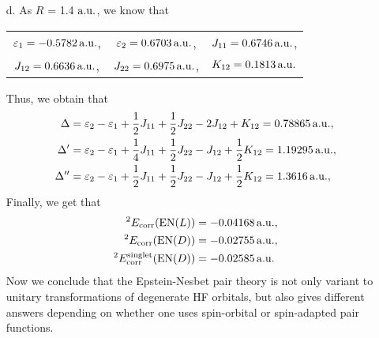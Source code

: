 \documentclass[a4paper]{book}
\newcounter{solution}[chapter]
\newcommand{\corr}{{\rm corr}}
\newcommand{\au}{{\rm a.u.}}
\begin{document}
\begin{solution}
\begin{itemize}
	\item[d.] As $R$ = 1.4 $\au$, we know that
	\begin{center}
	\begin{tabular}{ccc}
		$\varepsilon_1 = -0.5782\,\au$, & $\varepsilon_2 = 0.6703\, \au$, & $J_{11} = 0.6746\,\au$, \\
		$J_{12} = 0.6636\,\au$, & $J_{22} = 0.6975\,\au$, & $K_{12} = 0.1813\,\au$
	\end{tabular}
	\end{center}
	Thus, we obtain that
	\begin{align*}
		\Delta &= \varepsilon_2 - \varepsilon_1 + \frac{1}{2} J_{11} + \frac{1}{2} J_{22} - 2 J_{12} + K_{12} = 0.78865 \, \au , \\
		\Delta^\prime &= \varepsilon_2 - \varepsilon_1 + \frac{1}{4} J_{11} + \frac{1}{2} J_{22} - J_{12} + \frac{1}{2} K_{12} = 1.19295 \, \au , \\
		\Delta^{\prime\prime} &= \varepsilon_2 - \varepsilon_1 + \frac{1}{2} J_{11} + \frac{1}{2} J_{22} - J_{12} + \frac{1}{2} K_{12} = 1.3616 \, \au ,
	\end{align*}
	Finally, we get that
	\begin{align*}
		{}^2 E_\corr( {\rm EN}(L) ) &= -0.04168 \, \au , \\
		{}^2 E_\corr( {\rm EN}(D) ) &= -0.02755 \, \au , \\
		{}^2 E^{\rm singlet}_\corr( {\rm EN}(D) ) &= -0.02585 \, \au 
	\end{align*}
	Now we conclude that the Epstein-Nesbet pair theory is not only variant to unitary transformations of degenerate HF orbitals, but also gives different answers depending on whether  one uses spin-orbital or spin-adapted pair functions.
		
	\end{itemize}
	
	\end{solution}
	
\end{document}
